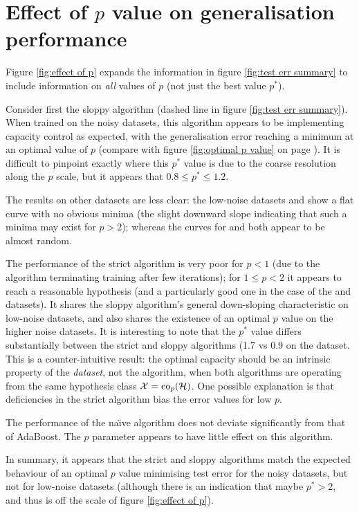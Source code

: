\section{Effect of $p$ value on generalisation performance}

Figure \ref{fig:effect of p} expands the information in figure
\ref{fig:test err summary} to include information on \emph{all} values
of $p$ (not just the best value $p^{\ast}$).

Consider first the sloppy algorithm (dashed line in figure
\ref{fig:test err summary}).  When trained on the noisy 
datasets, this algorithm appears to be implementing capacity control
as expected, with the generalisation error reaching a minimum at an
optimal value of $p$ (compare with figure \ref{fig:optimal p value} on
page \pageref{fig:optimal p value}).  It is difficult to pinpoint
exactly where this $p^{\ast}$ value is due to the coarse resolution
along the $p$ scale, but it appears that $0.8 \leq p^{\ast} \leq 1.2$.

The results on other datasets are less clear: the low-noise datasets
 and  show a flat curve with no obvious minima
(the slight downward slope indicating that such a minima may exist for
$p > 2$); whereas the curves for  and  both appear
to be almost random.

The performance of the strict algorithm is very poor for $p < 1$ (due
to the algorithm terminating training after few iterations); for $1
\leq p < 2$ it appears to reach a reasonable hypothesis (and a
particularly good one in the case of the  and 
datasets).  It shares the sloppy algorithm's general down-sloping
characteristic on low-noise datasets, and also shares the existence of
an optimal $p$ value on the higher noise datasets.  It is interesting
to note that the $p^{\ast}$ value differs substantially between the
strict and sloppy algorithms (1.7 vs 0.9 on the  dataset.
This is a counter-intuitive result: the optimal capacity should be an
intrinsic property of the \emph{dataset}, not the algorithm, when both
algorithms are operating from the same hypothesis class $\mathcal{X} =
\mathrm{co}_p(\mathcal{H})$.  One possible explanation is that deficiencies in the
strict algorithm bias the error values for low $p$.

The performance of the na\"{\i}ve algorithm does not deviate
significantly from that of AdaBoost.  The $p$ parameter appears to
have little effect on this algorithm.

In summary, it appears that the strict and sloppy algorithms match the
expected behaviour of an optimal $p$ value minimising test error for
the noisy datasets, but not for low-noise datasets (although there is
an indication that maybe $p^{\ast} > 2$, and thus is off the scale of
figure \ref{fig:effect of p}).

